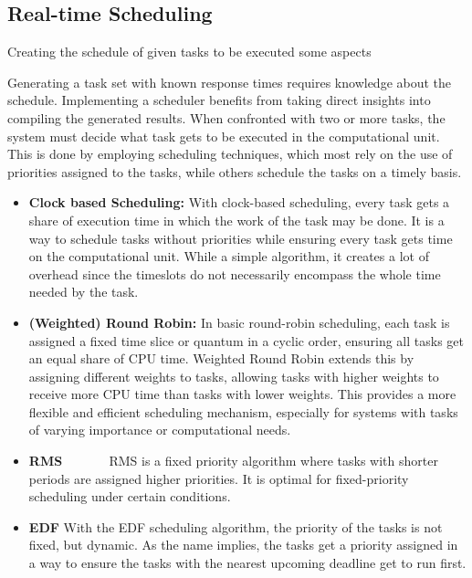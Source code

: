 \subsection{Real-time Scheduling}\label{sec:scheduling}
Creating the schedule of given tasks to be executed some aspects

Generating a task set with known response times requires knowledge about the schedule. Implementing a scheduler benefits from taking direct insights into compiling the generated results. 
When confronted with two or more tasks, the system must decide what task gets to be executed in the computational unit.
This is done by employing scheduling techniques, which most rely on the use of priorities assigned to the tasks, while others schedule the tasks on a timely basis.

\begin{itemize}
    \item \textbf{Clock based Scheduling:}
 With clock-based scheduling, every task gets a share of execution time in which the work of the task may be done. It is a way to schedule tasks without priorities while ensuring every task gets time on the computational unit. While a simple algorithm, it creates a lot of overhead since the timeslots do not necessarily encompass the whole time needed by the task.
    \item \textbf{(Weighted) Round Robin:}
 In basic round-robin scheduling, each task is assigned a fixed time slice or quantum in a cyclic order, ensuring all tasks get an equal share of CPU time. Weighted Round Robin extends this by assigning different weights to tasks, allowing tasks with higher weights to receive more CPU time than tasks with lower weights. This provides a more flexible and efficient scheduling mechanism, especially for systems with tasks of varying importance or computational needs. \cite{helmyOptimizingRoundRobinScheduling2024}
    \item \textbf{\ac{RMS}} 
        \ac{RMS} is a fixed priority algorithm where tasks with shorter periods are assigned higher priorities. 
 It is optimal for fixed-priority scheduling under certain conditions. \cite{lehoczkyRateMonotonicScheduling1989}
    \item \textbf{\ac{EDF}} 
 With the \ac{EDF} scheduling algorithm, the priority of the tasks is not fixed, but dynamic. 
 As the name implies, the tasks get a priority assigned in a way to ensure the tasks with the nearest upcoming deadline get to run first.\cite{lehoczkyPerformanceRealtimeBus1986}
\end{itemize}

